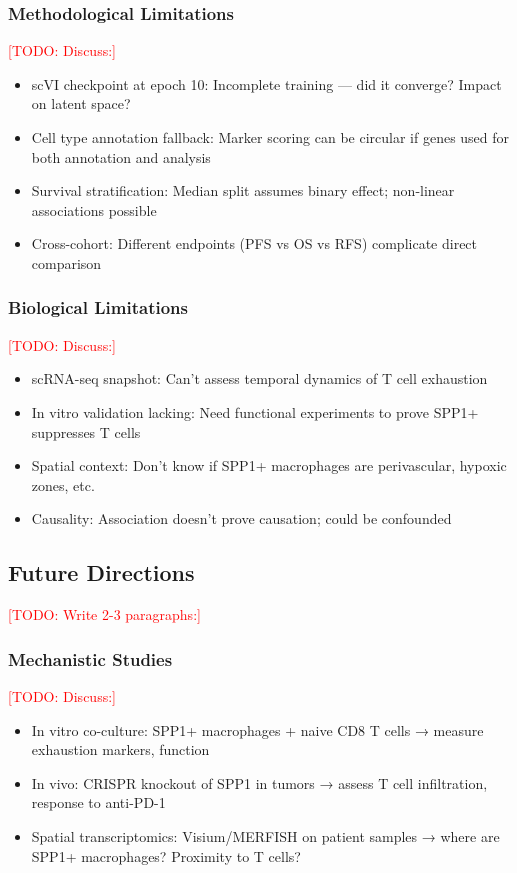 \documentclass[12pt,oneside]{article}
\newcommand{\TODO}[1]{\textcolor{red}{[TODO: #1]}}
\begin{document}
\subsubsection*{Methodological Limitations}
\TODO{Discuss:}
\begin{itemize}
    \item scVI checkpoint at epoch 10: Incomplete training — did it converge? Impact on latent space?
    \item Cell type annotation fallback: Marker scoring can be circular if genes used for both annotation and analysis
    \item Survival stratification: Median split assumes binary effect; non-linear associations possible
    \item Cross-cohort: Different endpoints (PFS vs OS vs RFS) complicate direct comparison
\end{itemize}

\subsubsection*{Biological Limitations}
\TODO{Discuss:}
\begin{itemize}
    \item scRNA-seq snapshot: Can't assess temporal dynamics of T cell exhaustion
    \item In vitro validation lacking: Need functional experiments to prove SPP1+ suppresses T cells
    \item Spatial context: Don't know if SPP1+ macrophages are perivascular, hypoxic zones, etc.
    \item Causality: Association doesn't prove causation; could be confounded
\end{itemize}

\subsection{Future Directions}
\TODO{Write 2-3 paragraphs:}

\subsubsection*{Mechanistic Studies}
\TODO{Discuss:}
\begin{itemize}
    \item In vitro co-culture: SPP1+ macrophages + naive CD8 T cells → measure exhaustion markers, function
    \item In vivo: CRISPR knockout of SPP1 in tumors → assess T cell infiltration, response to anti-PD-1
    \item Spatial transcriptomics: Visium/MERFISH on patient samples → where are SPP1+ macrophages? Proximity to T cells?
\end{itemize}
\end{document}
